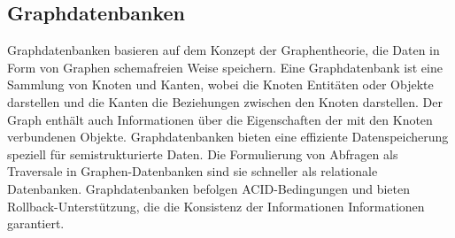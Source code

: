 \subsection{Graphdatenbanken} %
\label{sec:graphDatenbanken}
Graphdatenbanken basieren auf dem Konzept der Graphentheorie, die Daten in Form von Graphen schemafreien Weise speichern. Eine Graphdatenbank ist eine Sammlung von Knoten und Kanten, wobei die Knoten Entitäten oder Objekte darstellen und die Kanten die Beziehungen zwischen den Knoten darstellen. Der Graph  enthält auch Informationen über die Eigenschaften der mit den Knoten verbundenen Objekte. Graphdatenbanken bieten eine effiziente Datenspeicherung speziell für semistrukturierte Daten. Die Formulierung von Abfragen als Traversale in Graphen-Datenbanken sind sie schneller als relationale Datenbanken. Graphdatenbanken befolgen ACID-Bedingungen und bieten Rollback-Unterstützung, die die Konsistenz der Informationen Informationen garantiert.
\citep{9677042}

